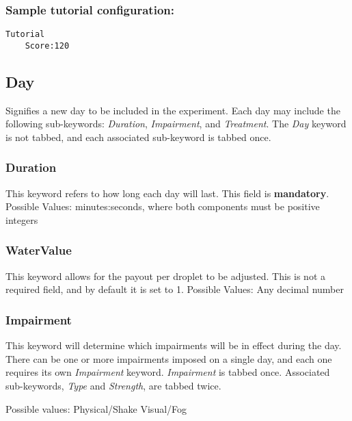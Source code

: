 \documentclass{article}
\begin{document}
\subsubsection*{Sample tutorial configuration:}
\begin{lstlisting}
Tutorial
    Score:120
\end{lstlisting}

\pagebreak\subsection*{Day}
Signifies a new day to be included in the experiment. Each day may include the following sub-keywords: \textit{Duration}, \textit{Impairment}, and \textit{Treatment}. The \textit{Day} keyword is not tabbed, and each associated sub-keyword is tabbed once.

\subsubsection*{Duration}
This keyword refers to how long each day will last. This field is \textbf{mandatory}. \newline
\indent Possible Values: \newline
\indent\indent minutes:seconds, where both components must be positive integers

\subsubsection*{WaterValue}
This keyword allows for the payout per droplet to be adjusted. This is not a required field, and by default it is set to 1. \newline
\indent Possible Values: \newline
\indent\indent Any decimal number

\subsubsection*{Impairment}
This keyword will determine which impairments will be in effect during the day. There can be one or more impairments imposed on a single day, and each one requires its own \textit{Impairment} keyword. \textit{Impairment} is tabbed once. Associated sub-keywords, \textit{Type} and \textit{Strength}, are tabbed twice. \newline

 \newline
\indent Possible values: \newline
\indent\indent Physical/Shake \newline
\indent\indent Visual/Fog \newline
\end{document}
